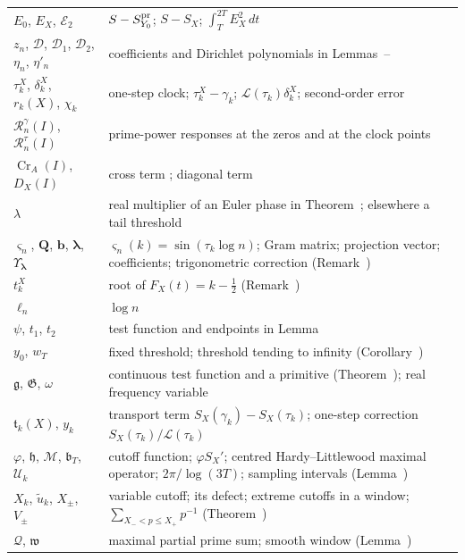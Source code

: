 \documentclass[preprint,12pt]{elsarticle}
\makeatletter
\let\CG@origref\ref
\let\CG@origeqref\eqref
\newcommand{\CG@gettip}[1]{\@ifundefined{CGTip@#1}{Reference: #1}{\csname CGTip@#1\endcsname}}
\DeclareRobustCommand{\CGref}[1]{\pdftooltip{\CG@origref{#1}}{\CG@gettip{#1}}}
\DeclareRobustCommand{\CGeqref}[1]{\pdftooltip{\CG@origeqref{#1}}{\CG@gettip{#1}}}
\numberwithin{equation}{section}
\theoremstyle{plain}
\theoremstyle{definition}
\theoremstyle{remark}
\newcommand{\lL}{\mathcal L}
\newcommand{\Cr}{\operatorname{Cr}}
\newcommand{\Rg}{\mathcal R^{\gamma}}
\newcommand{\Rt}{\mathcal R^{\tau}}
\makeatother
\begin{document}
\begin{center}
\begin{longtable}{p{}p{}}
$E_0$, $E_X$, $\mathcal E_2$ & $S-S^{\rm pr}_{Y_0}$; $S-S_X$; $\int_T^{2T}E_X^2\,dt$\\
$z_n$, $\mathcal D$, $\mathcal D_1$, $\mathcal D_2$, $\eta_n$, $\eta'_n$ & coefficients and Dirichlet polynomials in Lemmas~\CGref{lem:trig_MV}--\CGref{lem:D_moments}\\
$\tau_k^X$, $\delta_k^X$, $r_k(X)$, $\chi_k$ & one-step clock; $\tau_k^X-\gamma_k$; $\lL(\tau_k)\delta_k^X$; second-order error \CGeqref{eq:one_step_decomposition}\\
$\Rg_n(I)$, $\Rt_n(I)$ & prime-power responses at the zeros and at the clock points \CGeqref{eq:two_responses}\\
$\Cr_A(I)$, $D_X(I)$ & cross term \CGeqref{eq:Cr_def}; diagonal term \CGeqref{eq:full_factor_gain}\\
$\lambda$ & real multiplier of an Euler phase in Theorem~\CGref{thm:accounting}; elsewhere a tail threshold\\
$\varsigma_n$, $\mathbf Q$, $\mathbf b$, $\boldsymbol\lambda$, $\Upsilon_{\boldsymbol\lambda}$ & $\varsigma_n(k)=\sin(\tau_k\log n)$; Gram matrix; projection vector; coefficients; trigonometric correction (Remark~\CGref{rem:matrix_projection})\\
$t_k^X$ & root of $F_X(t)=k-\frac12$ (Remark~\CGref{rem:localization})\\
$\ell_n$ & $\log n$\\
$\psi$, $t_1$, $t_2$ & test function and endpoints in Lemma~\CGref{lem:first_moment_identity}\\
$y_0$, $w_T$ & fixed threshold; threshold tending to infinity (Corollary~\CGref{cor:dichotomy})\\
$\mathfrak g$, $\mathfrak G$, $\omega$ & continuous test function and a primitive (Theorem~\CGref{thm:identity_g}); real frequency variable\\
$\mathfrak t_k(X)$, $y_k$ & transport term $S_X(\gamma_k)-S_X(\tau_k)$; one-step correction $S_X(\tau_k)/\lL(\tau_k)$\\
$\varphi$, $\mathfrak h$, $\mathcal M$, $\mathfrak b_T$, $\mathcal U_k$ & cutoff function; $\varphi S_X'$; centred Hardy--Littlewood maximal operator; $2\pi/\log(3T)$; sampling intervals (Lemma~\CGref{lem:transport})\\
$X_k$, $\tilde u_k$, $X_\pm$, $V_\pm$ & variable cutoff; its defect; extreme cutoffs in a window; $\sum_{X_-<p\le X_+}p^{-1}$ (Theorem~\CGref{thm:variable_cutoff})\\
$\mathcal Q$, $\mathfrak w$ & maximal partial prime sum; smooth window (Lemma~\CGref{lem:maximal_primes})\\

\end{longtable}
\end{center}
\end{document}

